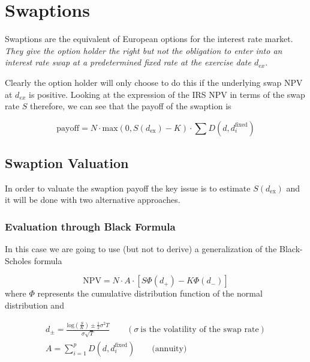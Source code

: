 \section{Swaptions}
\label{interest-rate-swaptions}

Swaptions are the equivalent of European options for the interest rate market. \emph{They give the option holder the right but not the obligation to enter into an interest rate swap at a predetermined fixed rate at the exercise date $d_{ex}$}.

Clearly the option holder will only choose to do this if the underlying swap NPV at $d_{ex}$ is positive. Looking at the expression of the IRS NPV in terms of the swap rate $S$ therefore, we can see that the payoff of the swaption is

\begin{equation}
\mathrm{payoff} = N\cdot \mathrm{max}(0, S(d_{\mathrm{ex}}) - K)\cdot\sum D(d, d_i^{\mathrm{fixed}})
\label{eq:swaption_payoff}
\end{equation}

\subsection{Swaption Valuation}

In order to valuate the swaption payoff the key issue is to estimate $S(d_{\mathrm{ex}})$ and it will be done with two alternative approaches.

\subsubsection{Evaluation through Black Formula}
\label{evaluation-through-black-scholes-formula}

In this case we are going to use (but not to derive) a generalization of the Black-Scholes formula

\begin{equation}
\mathrm{NPV} = N\cdot A\cdot [S \Phi(d_+) - K\Phi(d_-)]
\end{equation}
where $\Phi$ represents the cumulative distribution function of the normal distribution and

\begin{equation}
\begin{gathered}
d_{\pm} = \frac{\mathrm{log}(\frac{S}{K}) \pm \frac{1}{2}\sigma^{2}T}{\sigma\sqrt{T}}\qquad(\sigma~\textrm{is the volatility of the swap rate})\\
A = \sum_{i=1}^{p}D(d, d_{i}^{\mathrm{fixed}})\qquad\mathrm{(annuity})
\end{gathered}
\end{equation}

